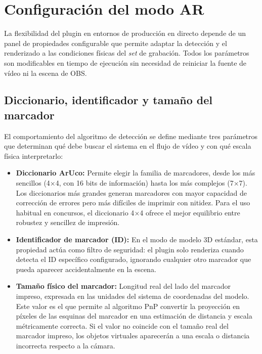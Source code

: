 \section{Configuración del modo AR}
\label{sec:config_ar}

La flexibilidad del plugin en entornos de producción en directo depende de un panel de
propiedades configurable que permite adaptar la detección y el renderizado a las condiciones
físicas del \textit{set} de grabación. Todos los parámetros son modificables en tiempo de ejecución sin
necesidad de reiniciar la fuente de vídeo ni la escena de OBS.


\subsection{Diccionario, identificador y tamaño del marcador}
\label{subsec:config_detector}

El comportamiento del algoritmo de detección se define mediante tres parámetros que determinan
qué debe buscar el sistema en el flujo de vídeo y con qué escala física interpretarlo:

\begin{itemize}
    \item \textbf{Diccionario ArUco:} Permite elegir la familia de marcadores, desde los más
    sencillos (4$\times$4, con 16 bits de información) hasta los más complejos (7$\times$7).
    Los diccionarios más grandes generan marcadores con mayor capacidad de corrección de errores
    pero más difíciles de imprimir con nitidez. Para el uso habitual en concursos, el diccionario
    4$\times$4 ofrece el mejor equilibrio entre robustez y sencillez de impresión.
    \item \textbf{Identificador de marcador (ID):} En el modo de modelo 3D estándar, esta
    propiedad actúa como filtro de seguridad: el plugin solo renderiza cuando detecta el ID
    específico configurado, ignorando cualquier otro marcador que pueda aparecer accidentalmente
    en la escena.
    \item \textbf{Tamaño físico del marcador:} Longitud real del lado del marcador impreso,
    expresada en las unidades del sistema de coordenadas del modelo. Este valor es el que permite
    al algoritmo PnP convertir la proyección en píxeles de las esquinas del marcador en una
    estimación de distancia y escala métricamente correcta. Si el valor no coincide con el
    tamaño real del marcador impreso, los objetos virtuales aparecerán a una escala o distancia
    incorrecta respecto a la cámara.
\end{itemize}

